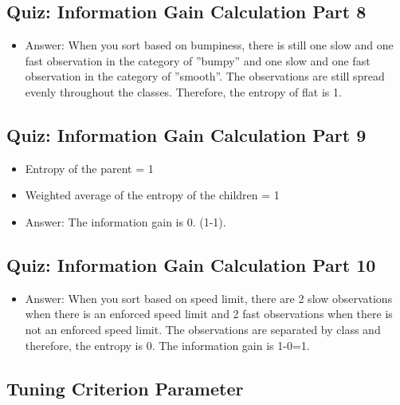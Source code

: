 \documentclass[12pt]{report}
\begin{document}
\subsection{Quiz: Information Gain Calculation Part 8}

\begin{itemize}

\item Answer: When you sort based on bumpiness, there is still one slow and one fast observation in the category of ''bumpy'' and one slow and one fast observation in the category of ''smooth''. The observations are still spread evenly throughout the classes. Therefore, the entropy of flat is 1. 


\end{itemize}

\subsection{Quiz: Information Gain Calculation Part 9}

\begin{itemize}

\item Entropy of the parent = 1

\item Weighted average of the entropy of the children = 1

\item Answer: The information gain is 0. (1-1). 

\end{itemize}

\subsection{Quiz: Information Gain Calculation Part 10}

\begin{itemize}

\item Answer: When you sort based on speed limit, there are 2 slow observations when there is an enforced speed limit and 2 fast observations when there is not an enforced speed limit. The observations are separated by class and therefore, the entropy is 0. The information gain is 1-0=1. 

\end{itemize}

\subsection{Tuning Criterion Parameter}
\end{document}
